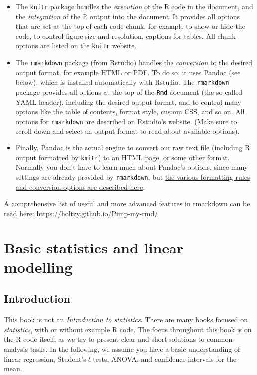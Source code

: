\documentclass[]{book}
\providecommand{\tightlist}{%
  \setlength{\itemsep}{0pt}\setlength{\parskip}{0pt}}
\let\BeginKnitrBlock\begin \let\EndKnitrBlock\end
\begin{document}
\begin{itemize}
\tightlist
\item
  The \texttt{knitr} package handles the \emph{execution} of the R code in the document, and the \emph{integration} of the R output into the document. It provides all options that are set at the top of each code chunk, for example to show or hide the code, to control figure size and resolution, captions for tables. All chunk options are \href{https://yihui.name/knitr/options/}{listed on the \texttt{knitr} website}.
\item
  The \texttt{rmarkdown} package (from Rstudio) handles the \emph{conversion} to the desired output format, for example HTML or PDF. To do so, it uses Pandoc (see below), which is installed automatically with Rstudio. The \texttt{rmarkdown} package provides all options at the top of the \texttt{Rmd} document (the so-called YAML header), including the desired output format, and to control many options like the table of contents, format style, custom CSS, and so on. All options for \texttt{rmarkdown} \href{https://rmarkdown.rstudio.com/}{are described on Rstudio's website}. (Make sure to scroll down and select an output format to read about available options).
\item
  Finally, Pandoc is the actual engine to convert our raw text file (including R output formatted by \texttt{knitr}) to an HTML page, or some other format. Normally you don't have to learn much about Pandoc's options, since many settings are already provided by \texttt{rmarkdown}, but \href{https://pandoc.org/MANUAL.html}{the various formatting rules and conversion options are described here}.
\end{itemize}

\BeginKnitrBlock{rmdreading}
A comprehensive list of useful and more advanced features in rmarkdown can be read here: \url{https://holtzy.github.io/Pimp-my-rmd/}
\EndKnitrBlock{rmdreading}

\hypertarget{linmodel}{%
\chapter{Basic statistics and linear modelling}\label{linmodel}}

\hypertarget{introduction-2}{%
\section{Introduction}\label{introduction-2}}

This book is not an \emph{Introduction to statistics}. There are many books focused on \emph{statistics}, with or without example R code. The focus throughout this book is on the R code itself, as we try to present clear and short solutions to common analysis tasks. In the following, we assume you have a basic understanding of linear regression, Student's \(t\)-tests, ANOVA, and confidence intervals for the mean.
\end{document}
